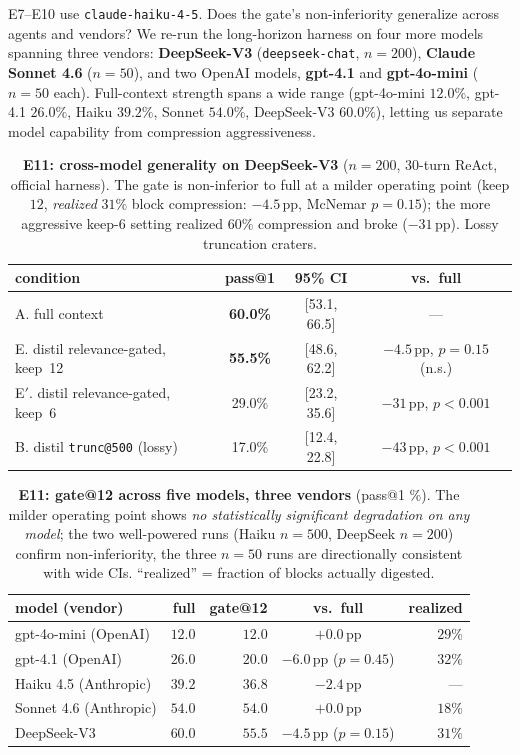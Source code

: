\documentclass[11pt]{article}
\begin{document}
E7--E10 use \texttt{claude-haiku-4-5}. Does the gate's non-inferiority generalize across agents
and vendors? We re-run the long-horizon harness on four more models spanning three vendors:
\textbf{DeepSeek-V3} (\texttt{deepseek-chat}, $n{=}200$), \textbf{Claude Sonnet 4.6}
($n{=}50$), and two OpenAI models, \textbf{gpt-4.1} and \textbf{gpt-4o-mini} ($n{=}50$ each).
Full-context strength spans a wide range (gpt-4o-mini $12.0\%$, gpt-4.1 $26.0\%$, Haiku
$39.2\%$, Sonnet $54.0\%$, DeepSeek-V3 $60.0\%$), letting us separate model capability from
compression aggressiveness.

\begin{table}[t]
\centering\small
\begin{tabular}{@{}l c c c@{}}
\toprule
condition & pass@1 & 95\% CI & vs.\ full \\
\midrule
A. full context & \textbf{60.0\%} & [53.1, 66.5] & --- \\
E. distil relevance-gated, keep~12 & \textbf{55.5\%} & [48.6, 62.2] & $-4.5$\,pp, $p{=}0.15$ (n.s.) \\
E$'$. distil relevance-gated, keep~6 & 29.0\% & [23.2, 35.6] & $-31$\,pp, $p{<}0.001$ \\
B. distil \texttt{trunc@500} (lossy) & 17.0\% & [12.4, 22.8] & $-43$\,pp, $p{<}0.001$ \\
\bottomrule
\end{tabular}
\caption{\textbf{E11: cross-model generality on DeepSeek-V3} ($n{=}200$, 30-turn ReAct,
official harness). The gate is non-inferior to full at a milder operating point (keep $12$,
\emph{realized} $31\%$ block compression: $-4.5$\,pp, McNemar $p{=}0.15$); the more aggressive
keep-$6$ setting realized $60\%$ compression and broke ($-31$\,pp). Lossy truncation craters.}
\label{tab:e11}
\end{table}

\begin{table}[t]
\centering\small
\begin{tabular}{@{}l r r c r@{}}
\toprule
model (vendor) & full & gate@12 & vs.\ full & realized \\
\midrule
gpt-4o-mini (OpenAI) & $12.0$ & $12.0$ & $+0.0$\,pp & $29\%$ \\
gpt-4.1 (OpenAI) & $26.0$ & $20.0$ & $-6.0$\,pp ($p{=}0.45$) & $32\%$ \\
Haiku 4.5 (Anthropic) & $39.2$ & $36.8$ & $-2.4$\,pp & --- \\
Sonnet 4.6 (Anthropic) & $54.0$ & $54.0$ & $+0.0$\,pp & $18\%$ \\
DeepSeek-V3 & $60.0$ & $55.5$ & $-4.5$\,pp ($p{=}0.15$) & $31\%$ \\
\bottomrule
\end{tabular}
\caption{\textbf{E11: gate@12 across five models, three vendors} (pass@1 \%). The milder
operating point shows \emph{no statistically significant degradation on any model}; the two
well-powered runs (Haiku $n{=}500$, DeepSeek $n{=}200$) confirm non-inferiority, the three
$n{=}50$ runs are directionally consistent with wide CIs. ``realized'' = fraction of blocks
actually digested.}
\label{tab:e11all}
\end{table}
\end{document}
